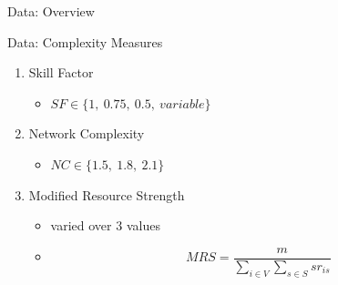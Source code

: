 \documentclass{beamer}
\begin{document}
\begin{frame}{Data: Overview}
\end{frame}

\begin{frame}{Data: Complexity Measures}
	\begin{enumerate}
		\item Skill Factor
		\vspace{1mm}
		\begin{itemize}
			\item $SF \in \{1,~0.75,~0.5,~variable\}$\pause
		\end{itemize}
		\vspace{2mm}
		\item Network Complexity
		\vspace{1mm}
		\begin{itemize}
			\item $NC \in \{1.5,~1.8,~2.1\}$\pause
		\end{itemize}
		\vspace{2mm}
		\item Modified Resource Strength
		\vspace{1mm}
		\begin{itemize}
			\item varied over 3 values
			\item \[MRS=\frac{m}{\sum_{i\in V}\sum_{s \in S}sr_{is}}\]
		\end{itemize}
	\end{enumerate}
\end{frame}


\end{document}
